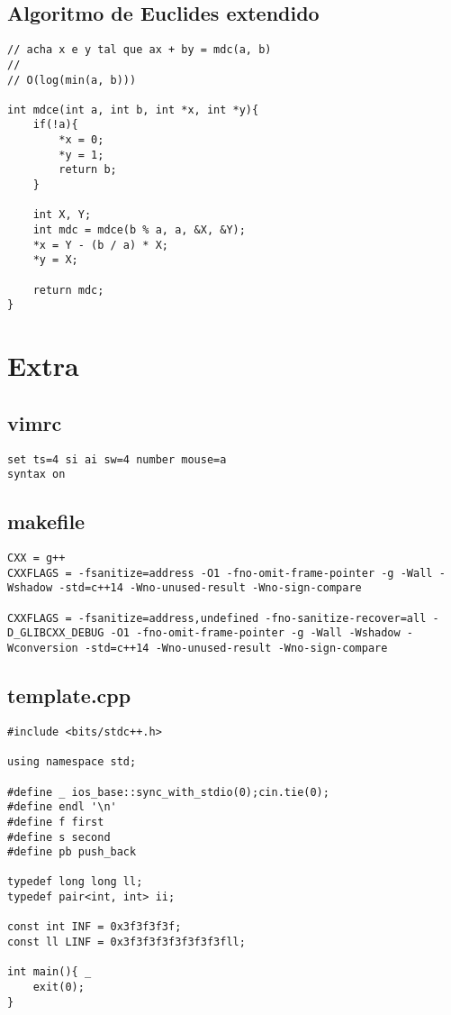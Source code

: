 \documentclass[12pt, a4paper, twoside]{article}
\begin{document}
\subsection{Algoritmo de Euclides extendido}
\begin{lstlisting}
// acha x e y tal que ax + by = mdc(a, b)
//
// O(log(min(a, b)))

int mdce(int a, int b, int *x, int *y){
	if(!a){
		*x = 0;
		*y = 1;
		return b;
	}

	int X, Y;
	int mdc = mdce(b % a, a, &X, &Y);
	*x = Y - (b / a) * X;
	*y = X;

	return mdc;
}
\end{lstlisting}



%
%

\section{Extra}

\subsection{vimrc}
\begin{lstlisting}
set ts=4 si ai sw=4 number mouse=a
syntax on
\end{lstlisting}

\subsection{makefile}
\begin{lstlisting}
CXX = g++
CXXFLAGS = -fsanitize=address -O1 -fno-omit-frame-pointer -g -Wall -Wshadow -std=c++14 -Wno-unused-result -Wno-sign-compare

CXXFLAGS = -fsanitize=address,undefined -fno-sanitize-recover=all -D_GLIBCXX_DEBUG -O1 -fno-omit-frame-pointer -g -Wall -Wshadow -Wconversion -std=c++14 -Wno-unused-result -Wno-sign-compare
\end{lstlisting}

\subsection{template.cpp}
\begin{lstlisting}
#include <bits/stdc++.h>

using namespace std;

#define _ ios_base::sync_with_stdio(0);cin.tie(0);
#define endl '\n'
#define f first
#define s second
#define pb push_back

typedef long long ll;
typedef pair<int, int> ii;

const int INF = 0x3f3f3f3f;
const ll LINF = 0x3f3f3f3f3f3f3f3fll;

int main(){ _
	exit(0);
}
\end{lstlisting}
\end{document}
